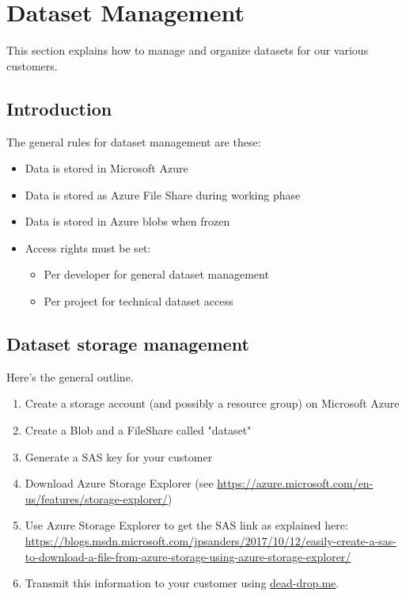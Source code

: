 \chapter{Dataset Management}
\label{chapter:dataset-management}

This section explains how to manage and organize datasets for our various customers.

\section{Introduction}

The general rules for dataset management are these:

\begin{itemize}
    \item Data is stored in Microsoft Azure
    \item Data is stored as Azure File Share during working phase
    \item Data is stored in Azure blobs when frozen
    \item Access rights must be set:
    \begin{itemize}
        \item Per developer for general dataset management
        \item Per project for technical dataset access
    \end{itemize}
\end{itemize}

\section{Dataset storage management}

Here's the general outline.

\begin{enumerate}
    \item Create a storage account (and possibly a resource group) on Microsoft Azure
    \item Create a Blob and a FileShare called "dataset"
    \item Generate a SAS key for your customer
    \item Download Azure Storage Explorer (see \url{https://azure.microsoft.com/en-us/features/storage-explorer/})
    \item Use Azure Storage Explorer to get the SAS link as explained here: \url{https://blogs.msdn.microsoft.com/jpsanders/2017/10/12/easily-create-a-sas-to-download-a-file-from-azure-storage-using-azure-storage-explorer/}
    \item Transmit this information to your customer using \url{dead-drop.me}.
\end{enumerate}

